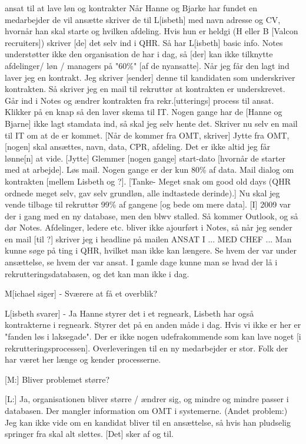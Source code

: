 \begin{linenumbers*}
[L: Jeg er] ansat til at lave løn og kontrakter
Når Hanne og Bjarke har fundet en medarbejder de vil ansætte skriver de til L[isbeth] med navn adresse og CV, hvornår han skal starte og hvilken afdeling.
Hvis hun er heldgi (H eller B [Valcon recruiters]) skriver [de] det selv ind i QHR. Så har L[isbeth] basic info. Notes understøtter ikke den organisation de har i dag, så [der] kan ikke tilknytte afdelinger/ løn / managers på "60\%" [af de nyansatte]. Når jeg får den lagt ind laver jeg en kontrakt. 
Jeg skriver [sender] denne til kandidaten som underskriver kontrakten.
Så skriver jeg en mail til rekruttør at kontrakten er underskrevet. Går ind i Notes og ændrer kontrakten fra rekr.[utterings] process til ansat. Klikker på en knap så den laver skema til IT. Nogen gange har de [Hanne og Bjarne] ikke lagt stamdata ind, så skal jeg selv hente det.
Skriver nu selv en mail til IT om at de er kommet.
[Når de kommer fra OMT, skriver] Jytte fra OMT, [nogen] skal ansættes, navn, data, CPR, afdeling. Det er ikke altid jeg får lønne[n] at vide. [Jytte] Glemmer [nogen gange] start-dato [hvornår de starter med at arbejde]. Løs mail. Nogen gange er der kun 80\% af data.
Mail dialog om kontrakten [mellem Lisbeth og ?].
[Tanke- Meget snak om good old days (QHR ordnede meget selv, gav selv grundløn, alle indtastede derinde).]
Nu skal jeg vende tilbage til rekruttør 99\% af gangene [og bede om mere data].
[I] 2009 var der i gang med en ny database, men den blwv stalled. Så kommer Outlook, og så dør Notes. Afdelinger, ledere etc. bliver ikke ajourført i Notes, så når jeg sender en mail [til ?] skriver jeg i headline på mailen ANSAT I ... MED CHEF ...
Man kunne søge på ting i QHR, hvilket man ikke kan længere. Se hvem der var under ansættelse, se hvem der var ansat. I gamle dage kunne man se hvad der lå i rekrutteringsdatabasen, og det kan man ikke i dag.

M[ichael siger] - Sværere at få et overblik?

L[isbeth svarer] - Ja
Hanne styrer det i et regneark, Lisbeth har også kontrakterne i regneark. Styrer det på en anden måde i dag. Hvis vi ikke er her er "fanden løs i laksegade". Der er ikke nogen udefrakommende som kan lave noget [i rekrutteringsprocessen]. Overleveringen til en ny medarbejder er stor. Folk der har været her længe og kender processerne.

[M:] Bliver problemet større?

[L:] Ja, organisationen bliver større / ændrer sig, og mindre og mindre passer i databasen. Der mangler information om OMT i systemerne. 
(Andet problem:)
Jeg kan ikke vide om en kandidat bliver til en ansættelse, så hvis han pludselig springer fra skal alt slettes. [Det] sker af og til.


\end{linenumbers*}
